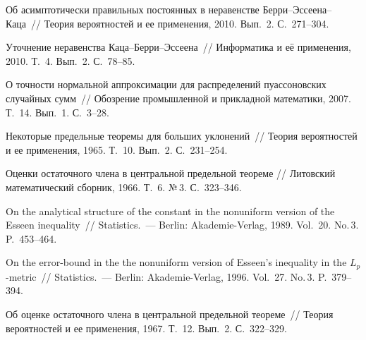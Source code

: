 \begin{multicols}{2}
{{\begin{thebibliography}{99}
\columnbreak

 Об асимптотически правильных постоянных в
неравенстве Бер\-ри--Эс\-се\-ена--Ка\-ца~// Теория вероятностей и ее
применения, 2010. Вып.~2. С.~271--304.

 Уточнение неравенства
Ка\-ца--Бер\-ри--Эс\-се\-ена~// Информатика и её применения, 2010. Т.~4.
Вып.~2. С.~78--85.

 О точности нормальной аппроксимации для
распределений пуассоновских случайных сумм~// Обозрение промышленной
и прикладной математики, 2007. Т.~14. Вып.~1. С.~3--28.

 Некоторые предельные теоремы для больших
уклонений~// Теория вероятностей и ее применения, 1965. Т.~10. Вып.~2. С.~231--254.

 Оценки остаточного члена в центральной
предельной теореме // Литовский математический сборник, 1966. Т.~6.
№\,3. С.~323--346.

 On the analytical structure of the constant in
the nonuniform version of the Esseen inequality~// Statistics.~---
Berlin: Akademie-Verlag, 1989. Vol.~20. No.\,3. P.~453--464.

 On the error-bound in the the nonuniform version
of Esseen's inequality in the $L_p$-metric~// Statistics.~--- Berlin: Akademie-Verlag, 1996. Vol.~27.
No.\,3. P.~379--394.

 \label{end\stat}
 \label{end-nefedova}

 Об оценке остаточного члена в
центральной предельной теореме~// Теория вероятностей и ее
применения, 1967. Т.~12. Вып.~2. С.~322--329.

 \end{thebibliography}
}
}


\end{multicols}  